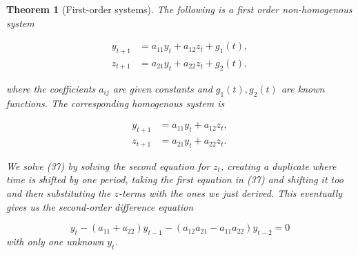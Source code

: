 \documentclass{article}
\newtheorem{theorem}{Theorem}
\theoremstyle{definition}
\theoremstyle{Solution}
\begin{document}
\begin{theorem}[First-order systems]
The following is a first order non-homogenous system

\begin{equation}
\begin{aligned}
	y_{t+1}&=a_{11}y_{t}+a_{12}z_{t}+g_{1}(t), \\
	z_{t+1}&=a_{21}y_{t}+a_{22}z_{t}+g_{2}(t),
\end{aligned}
\end{equation}

where the coefficients $a_{ij}$ are given constants and $g_1(t),g_2(t)$ are known functions. The corresponding homogenous system is

\begin{equation}
\begin{aligned}
	y_{t+1}&=a_{11}y_{t}+a_{12}z_{t}, \\
	z_{t+1}&=a_{21}y_{t}+a_{22}z_{t}.
\end{aligned}
\end{equation}

We solve (37) by solving the second equation for $z_t$, creating a duplicate where time is shifted by one period, taking the first equation in (37) and shifting it too and then substituting the $z$-terms with the ones we just derived. This eventually gives us the second-order difference equation

\begin{equation}
	y_{t}-(a_{11}+a_{22})y_{t-1}-(a_{12}a_{21}-a_{11}a_{22})y_{t-2}=0
\end{equation}
with only one unknown $y_t$.
\end{theorem}
\end{document}
